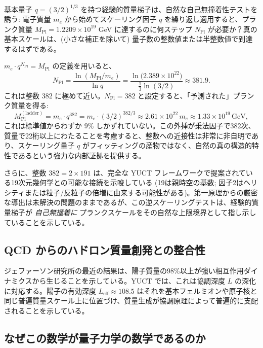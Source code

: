 \documentclass[11pt,a4paper]{article}
\newcommand{\Mpl}{M_{\mathrm{Pl}}}
\theoremstyle{remark}
\begin{document}
	基本量子 $q = (3/2)^{1/3}$ を持つ経験的質量梯子は、自然な自己無撞着性テストを誘う: 電子質量 $m_e$ から始めてスケーリング因子 $q$ を繰り返し適用すると、プランク質量 $\Mpl = 1.2209\times10^{19}$ GeV に達するのに何ステップ $N_{\mathrm{Pl}}$ が必要か？真の基本スケールは、(小さな補正を除いて) 量子数の整数値または半整数値で到達するはずである。
	
	$m_e \cdot q^{N_{\mathrm{Pl}}} = \Mpl$ の定義を用いると、
	\begin{equation}
		N_{\mathrm{Pl}} = \frac{\ln(\Mpl/m_e)}{\ln q}
		= \frac{\ln\!\big(2.389\times10^{22}\big)}{\frac13\ln(3/2)}
		\approx 381.9.
		\label{eq:Npl}
	\end{equation}
	これは整数 $382$ に極めて近い。$N_{\mathrm{Pl}} = 382$ と設定すると、「予測された」プランク質量を得る:
	\begin{equation}
		\Mpl^{\mathrm{(ladder)}} = m_e \cdot q^{382}
		= m_e \cdot (3/2)^{382/3}
		\approx 2.61\times10^{22}\,m_e
		\approx 1.33\times10^{19}\,\text{GeV},
		\label{eq:Mpl_ladder}
	\end{equation}
	これは標準値からわずか $9\%$ しかずれていない。この外挿が乗法因子で382次、質量で22桁以上にわたることを考慮すると、整数への近接性は非常に非自明であり、スケーリング量子 $q$ がフィッティングの産物ではなく、自然の真の構造的特性であるという強力な内部証拠を提供する。
	
	さらに、整数 $382 = 2 \times 191$ は、完全な YUCT フレームワークで提案されている19次元幾何学との可能な接続を示唆している (19は親時空の基数; 因子2はヘリシティまたは粒子/反粒子の倍増に由来する可能性がある)。第一原理からの厳密な導出は未解決の問題のままであるが、この逆スケーリングテストは、経験的質量梯子が \emph{自己無撞着に} プランクスケールをその自然な上限境界として指し示していることを示している。
	
	\subsection{QCD からのハドロン質量創発との整合性}
	
	ジェファーソン研究所の最近の結果は、陽子質量の98\%以上が強い相互作用ダイナミクスから生じることを示している。YUCT では、これは協調深度 \(L\) の深化に対応する。陽子の有効深度 \(L_{\mathrm{eff}} \approx 108.5\) はそれを基本フェルミオンや原子核と同じ普遍質量スケール上に位置づけ、質量生成が協調原理によって普遍的に支配されることを示している。
	
	\subsection{なぜこの数学が量子力学の数学であるのか}
	\label{subsec:QM-as-YUCT}
	
\end{document}
